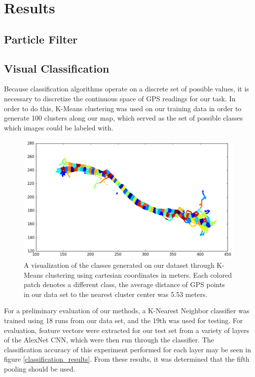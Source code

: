 \documentclass[letterpaper, 12 pt, conference]{ieeeconf}  %
\begin{document}
\section{Results}

\subsection{Particle Filter}

\subsection{Visual Classification}

Because classification algorithms operate on a discrete set of possible values, it is necessary to discretize the continuous space of GPS readings for our task. In order to do this, K-Means clustering was used on our training data in order to generate 100 clusters along our map, which served as the set of possible classes which images could be labeled with. 
\par 

\begin{figure}[h]
\centering
\includegraphics[scale=0.5]{clustering}
\caption{A visualization of the classes generated on our dataset through K-Means clustering using cartesian coordinates in meters. Each colored patch denotes a different class, the average distance of GPS points in our data set to the nearest cluster center was 5.53 meters.}
\label{clustering}
\end{figure}

For a preliminary evaluation of our methods, a K-Nearest Neighbor classifier was trained using 18 runs from our data set, and the 19th was used for testing. For evaluation, feature vectors were extracted for our test set from a variety of layers of the AlexNet CNN, which were then run through the classifier. The classification accuracy of this experiment performed for each layer may be seen in figure \ref{classification_results}. From these results, it was determined that the fifth pooling should be used.  
\end{document}
